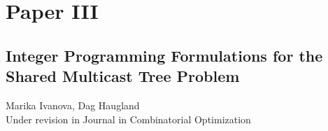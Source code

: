 \chapter*{Paper III}
\section{Integer Programming Formulations for the Shared Multicast Tree Problem}

\noindent Marika Ivanova, Dag Haugland\\

\noindent Under revision in Journal in Combinatorial Optimization
\cleardoublepage

